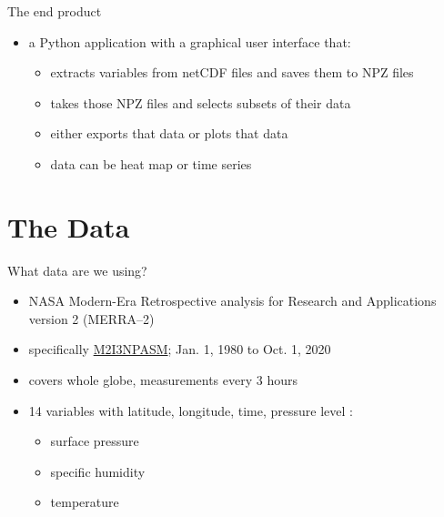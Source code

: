 \documentclass[
    hyperref={
        final,
        colorlinks=true,
        menucolor=black,
        anchorcolor=green,
        linkcolor=blue,
        citecolor=red,
        pdftitle={RS RAS Internship Presentation},
        pdfauthor={Moritz M. Konarski}
    }
]{beamer}
\begin{document}
\begin{frame}{The end product}
    \begin{itemize}
        \item a Python application with a graphical user interface that:
            \begin{itemize}
                \item extracts variables from netCDF files and saves them to NPZ 
                    files
                \item takes those NPZ files and selects subsets of their data
                \item either exports that data or plots that data
                \item data can be heat map or time series
            \end{itemize}
    \end{itemize}
\end{frame}

\section{The Data}

\begin{frame}{What data are we using?}
    \begin{itemize}
        \item NASA Modern-Era Retrospective analysis for Research and 
            Applications version 2 (MERRA--2)
        \item specifically
    \href{https://disc.gsfc.nasa.gov/datasets/M2I3NPASM_5.12.4/summary}{M2I3NPASM};
            Jan. 1, 1980 to Oct. 1, 2020
        \item covers whole globe, measurements every 3 hours \cite{data-summary}
        \item 14 variables with latitude, longitude, time, pressure level 
            \cite{data-readme}:
            \begin{itemize}
                \item surface pressure
                \item specific humidity
                \item temperature
            \end{itemize}
    \end{itemize}
\end{frame}
\end{document}

